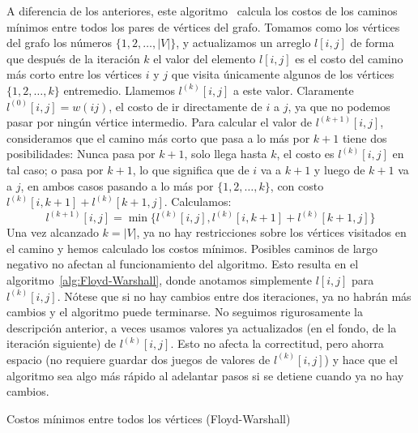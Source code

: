   A diferencia de los anteriores,
  este algoritmo~%
     \cite{floyd62:_algorithm97,warshall62:_theo_boolean_matrices}
  calcula los costos de los caminos mínimos
  entre todos los pares de vértices del grafo.
  Tomamos como los vértices del grafo
  los números \(\{1, 2, \dotsc, \lvert V \rvert\}\),
  y actualizamos un arreglo \(l[i, j]\)
  de forma que después de la iteración \(k\)
  el valor del elemento \(l[i, j]\)
  es el costo del camino más corto entre los vértices \(i\) y \(j\)
  que visita únicamente
  algunos de los vértices \(\{1, 2, \dotsc, k\}\) entremedio.
  Llamemos \(l^{(k)}[i, j]\) a este valor.
  Claramente \(l^{(0)}[i, j] = w(i j)\),
  el costo de ir directamente de \(i\) a \(j\),
  ya que no podemos pasar por ningún vértice intermedio.
  Para calcular el valor de \(l^{(k + 1)}[i, j]\),
  consideramos que el camino más corto
  que pasa a lo más por \(k + 1\)
  tiene dos posibilidades:
  Nunca pasa por \(k + 1\),
  solo llega hasta \(k\),
  el costo es \(l^{(k)}[i, j]\) en tal caso;
  o pasa por \(k + 1\),
  lo que significa que de \(i\) va a \(k + 1\)
  y luego de \(k + 1\) va a \(j\),
  en ambos casos pasando a lo más por \(\{1, 2, \dotsc, k\}\),
  con costo \(l^{(k)}[i, k + 1] + l^{(k)}[k + 1, j]\).
  Calculamos:
  \begin{equation*}
    l^{(k + 1)}[i, j]
      = \min \{l^{(k)}[i, j], l^{(k)}[i, k + 1]
		+ l^{(k)}[k + 1, j]\}
  \end{equation*}
  Una vez alcanzado \(k = \lvert V \rvert\),
  ya no hay restricciones sobre los vértices visitados en el camino
  y hemos calculado los costos mínimos.
  Posibles caminos de largo negativo
  no afectan al funcionamiento del algoritmo.
  Esto resulta en el algoritmo~\ref{alg:Floyd-Warshall},
  donde anotamos simplemente \(l[i, j]\) para \(l^{(k)}[i, j]\).
  Nótese que si no hay cambios entre dos iteraciones,
  ya no habrán más cambios y el algoritmo puede terminarse.
  No seguimos rigurosamente la descripción anterior,
  a veces usamos valores ya actualizados
  (en el fondo,
   de la iteración siguiente)
  de \(l^{(k)}[i, j]\).
  Esto no afecta la correctitud,
  pero ahorra espacio
  (no requiere guardar dos juegos de valores de \(l^{(k)}[i, j]\))
  y hace que el algoritmo sea algo más rápido al adelantar pasos
  si se detiene cuando ya no hay cambios.
  \begin{algorithm}[htbp]
    \DontPrintSemicolon

    \KwProcedure {} \;
    \BlankLine
    \caption{Costos mínimos entre todos los vértices
	     (Floyd-Warshall)}
    \label{alg:Floyd-Warshall}
  \end{algorithm}
